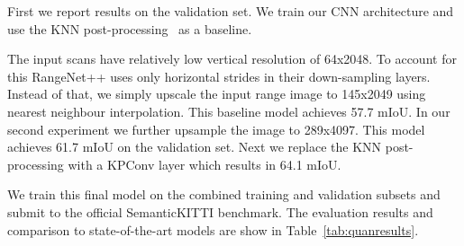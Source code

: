 \documentclass[runningheads]{llncs}
\begin{document}
First we report results on the validation set. We train our CNN architecture and use the KNN post-processing~\cite{rangenet} as a baseline.

The input scans have relatively low vertical resolution of 64x2048. To account for this RangeNet++ uses only horizontal strides in their down-sampling layers. Instead of that, we simply upscale the input range image to 145x2049 using nearest neighbour interpolation. This baseline model achieves 57.7 mIoU. In our second experiment we further upsample the image to 289x4097. This model achieves 61.7 mIoU on the validation set. Next we replace the KNN post-processing with a KPConv layer which results in 64.1 mIoU. 

We train this final model on the combined training and validation subsets and submit to the official SemanticKITTI benchmark. The evaluation results and comparison to state-of-the-art models are show in Table~\ref{tab:quanresults}.





\end{document}
